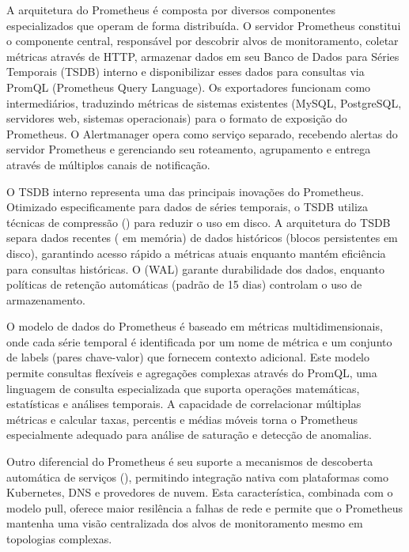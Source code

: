 A arquitetura do Prometheus é composta por diversos componentes especializados que operam de forma distribuída. O servidor Prometheus constitui o componente central, responsável por descobrir alvos de monitoramento, coletar métricas através de  HTTP, armazenar dados em seu Banco de Dados para Séries Temporais (TSDB) interno e disponibilizar esses dados para consultas via PromQL (Prometheus Query Language). Os exportadores funcionam como intermediários, traduzindo métricas de sistemas existentes (MySQL, PostgreSQL, servidores web, sistemas operacionais) para o formato de exposição do Prometheus. O Alertmanager opera como serviço separado, recebendo alertas do servidor Prometheus e gerenciando seu roteamento, agrupamento e entrega através de múltiplos canais de notificação.

O TSDB interno representa uma das principais inovações do Prometheus. Otimizado especificamente para dados de séries temporais, o TSDB utiliza técnicas de compressão () para reduzir o uso em disco. A arquitetura do TSDB separa dados recentes ( em memória) de dados históricos (blocos persistentes em disco), garantindo acesso rápido a métricas atuais enquanto mantém eficiência para consultas históricas. O  (WAL) garante durabilidade dos dados, enquanto políticas de retenção automáticas (padrão de 15 dias) controlam o uso de armazenamento.

O modelo de dados do Prometheus é baseado em métricas multidimensionais, onde cada série temporal é identificada por um nome de métrica e um conjunto de labels (pares chave-valor) que fornecem contexto adicional. Este modelo permite consultas flexíveis e agregações complexas através do PromQL, uma linguagem de consulta especializada que suporta operações matemáticas, estatísticas e análises temporais. A capacidade de correlacionar múltiplas métricas e calcular taxas, percentis e médias móveis torna o Prometheus especialmente adequado para análise de saturação e detecção de anomalias.

Outro diferencial do Prometheus é seu suporte a mecanismos de descoberta automática de serviços (), permitindo integração nativa com plataformas como Kubernetes, DNS e provedores de nuvem. Esta característica, combinada com o modelo pull, oferece maior resilência a falhas de rede e permite que o Prometheus mantenha uma visão centralizada dos alvos de monitoramento mesmo em topologias complexas.


